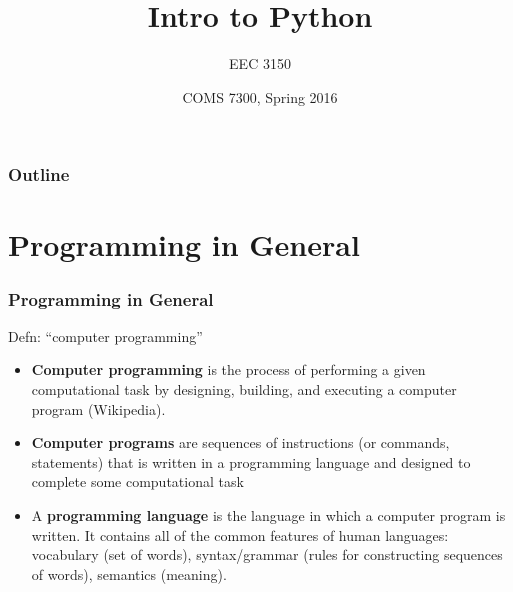 \documentclass{beamer}
\title{Intro to Python}
\author{EEC 3150}
\date{}
\institute
{
	GTA, Computational Science\\
	Middle Tennessee State University
}
\date{COMS 7300, Spring 2016}
\begin{document}
\frame{\titlepage}
 
\begin{frame}	
	\frametitle{Outline}
	\tableofcontents	
\end{frame}


\section{Programming in General}

\begin{frame}	
\end{frame}

\begin{frame}	
	\frametitle{Programming in General}
	
	\begin{alertblock}{Defn: ``computer programming''}
		\begin{itemize}
			\item \textbf{Computer programming} is the process of performing a given computational task by designing, building, and executing a computer program (Wikipedia).
			\item \textbf{Computer programs} are sequences of instructions (or commands, statements) that is written in a programming language and designed to complete some computational task
			\item A \textbf{programming language} is the language in which a computer program is written. It contains all of the common features of human languages: vocabulary (set of words), syntax/grammar (rules for constructing sequences of words), semantics (meaning). 
		\end{itemize}
	\end{alertblock}
	
\end{frame}
\end{document}
